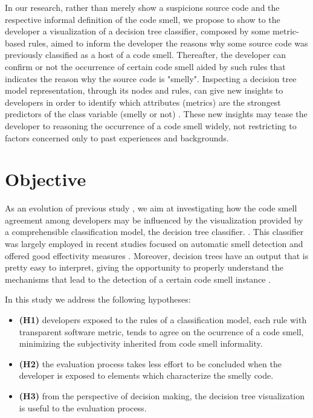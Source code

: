 In our research, rather than merely show a suspicions source code and the respective informal definition of the code smell, we propose to show to the developer a visualization of a decision tree classifier, composed by some metric-based rules, aimed to inform the developer the reasons why some source code was previously classified as a host of a code smell. Thereafter, the developer can confirm or not the occurrence of certain code smell aided by such rules that indicates the reason why the source code is "smelly". Inspecting a decision tree model representation, through its nodes and rules, can give new insights to developers in order to identify which attributes (metrics) are the strongest predictors of the class variable (smelly or not) \cite{freitas2014comprehensible}. These new insights may tease the developer to reasoning the occurrence of a code smell widely, not restricting to factors concerned only to past experiences and backgrounds.

\section{Objective}

As an evolution of previous study \cite{hozano2018you}, we aim at investigating how the code smell agreement among developers may be influenced by the visualization provided by a comprehensible classification model, the decision tree classifier. \cite{freitas2014comprehensible}. This classifier was largely employed \cite{azeem2019machine} in recent studies focused on automatic smell detection and offered good effectivity measures \cite{amorim2015experience}.  Moreover, decision trees have an output that is pretty easy to interpret, giving the opportunity to properly understand the mechanisms that lead to the detection of a certain code smell instance \cite{azeem2019machine}. 

In this study we address the following hypotheses:
    \begin{itemize}
        \item \textbf{(H1)} developers exposed to the rules of a classification model, each rule with transparent software metric, tends to agree on the ocurrence of a code smell, minimizing the subjectivity inherited from code smell informality.
        \item \textbf{(H2)} the evaluation process takes less effort to be concluded when the developer is exposed to elements which characterize the smelly code. 
        \item \textbf{(H3)} from the perspective of decision making, the decision tree visualization is useful to the evaluation process.
    \end{itemize}

